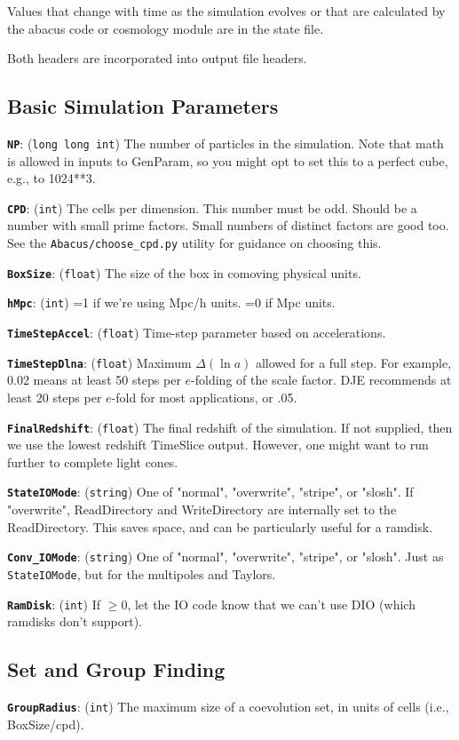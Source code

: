 \documentclass[11pt,preprint]{aastex}
\newcommand{\param}[2]{\medskip\noindent\textbf{\texttt{#1}}: ({\tt #2}) }
\newenvironment{private}{\comment}{\endcomment}
\newenvironment{private}
    {\textbf{Not public:}\\
    \begin{tabular}{|p{0.9\textwidth}|}
    \hline\\
    }
    {
    \\\\\hline
    \end{tabular}
    }
\begin{document}
Values that change with time as the simulation evolves or that are 
calculated by the abacus code or cosmology module are in the state
file.

Both headers are incorporated into output file headers. 

\subsection{Basic Simulation Parameters}

\param{NP}{long long int} The number of particles in the simulation.
Note that math is allowed in inputs to GenParam, so you might opt to
set this to a perfect cube, e.g., to 1024**3.

\param{CPD}{int} The cells per dimension.  This number must be odd.
Should be a number with small prime factors.  Small numbers of distinct factors are good too.
See the \texttt{Abacus/choose\_cpd.py} utility for guidance on choosing this.

\param{BoxSize}{float} The size of the box in comoving physical units.

\param{hMpc}{int} =1 if we're using Mpc/h units.  =0 if Mpc units.

\param{TimeStepAccel}{float} Time-step parameter based on accelerations.

\param{TimeStepDlna}{float} Maximum $\Delta(\ln a)$ allowed for a full step.
For example, 0.02 means at least 50 steps per $e$-folding of the scale factor.
DJE recommends at least 20 steps per $e$-fold for most applications, or .05.

\param{FinalRedshift}{float} The final redshift of the simulation.
If not supplied, then we use the lowest redshift TimeSlice output.
However, one might want to run further to complete light cones.

\param{StateIOMode}{string} One of "normal", "overwrite", "stripe", or "slosh".  If "overwrite", ReadDirectory and WriteDirectory are internally set to the ReadDirectory.
This saves space, and can be particularly useful for a ramdisk.

\param{Conv_IOMode}{string} One of "normal", "overwrite", "stripe", or "slosh".  Just as \texttt{StateIOMode}, but for the multipoles and Taylors.


\param{RamDisk}{int} If $\ge 0$, let the IO code know that we can't use DIO (which ramdisks don't support).

\begin{private}
\subsection{Set and Group Finding}

\param{GroupRadius}{int} The maximum size of a coevolution set, 
in units of cells (i.e., BoxSize/cpd).
\end{private}
\end{document}
